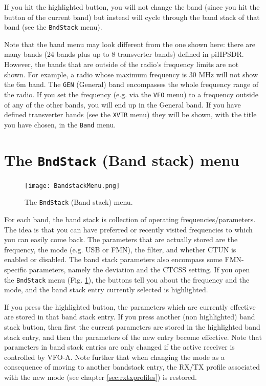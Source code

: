 \documentclass[12pt]{book}
\def\rett#1{\texttt{\color{red}#1}}
\def\bltt#1{\texttt{\color{blue}#1}}
\def\pH{pi\-HPSDR\xspace}
\begin{document}
If you hit the highlighted button, you will not change the band (since you hit the
button of the current band) but instead will cycle through the band stack of that band
(see the \bltt{BndStack} menu).


Note that the band menu may look different from the one shown here: there are many bands
(24 bands plus up to 8 transverter bands) defined in \pH. However, the bands that
are outside of the radio's frequency limits are not shown. For example, a radio
whose maximum frequency is 30 MHz will not show the 6m band. The \rett{GEN} (General)
band encompasses the whole frequency range of the radio. If you set the frequency
(e.g. via the \bltt{VFO} menu) to a frequency outside of any of the other bands, you
will end up in the General band. If you have defined transverter bands (see the
\bltt{XVTR} menu) they will be shown, with the title you have chosen, in the
\bltt{Band} menu.

\section{The  \texttt{BndStack} (Band stack) menu}

\begin{figure}[ht!]
\center
\texttt{[image: BandstackMenu.png]}
\caption{The \bltt{BndStack} (Band stack) menu.}
\label{fig:BandstackMenu}
\end{figure}

For each band, the band stack is collection of operating frequencies/parameters. The idea is that
you can have preferred or recently visited frequencies to which you can easily come back.
The parameters that are actually stored are the frequency, the mode (e.g. USB or FMN),
the filter, and whether CTUN is enabled or disabled. The band stack parameters
also encompass some FMN-specific parameters,  namely the deviation and
the  CTCSS setting.
If you open the \bltt{BndStack} menu (Fig. \ref{fig:BandstackMenu}), the buttons
tell you about the frequency and the mode, and the band stack entry currently selected is highlighted.

If you press the highlighted button, the parameters which are currently effective are stored in that band stack
entry. If you press another (non highlighted) band stack button, then first the current
parameters are stored in the highlighted band stack entry, and then the parameters of the
new entry become effective. Note that parameters in band stack entries are only changed if the active
receiver is controlled by VFO-A. Note further that when changing the mode as a consequence of
moving to another bandstack entry, the RX/TX profile associated with the new mode (see chapter \ref{sec:rxtxprofiles})
is restored.
\end{document}
